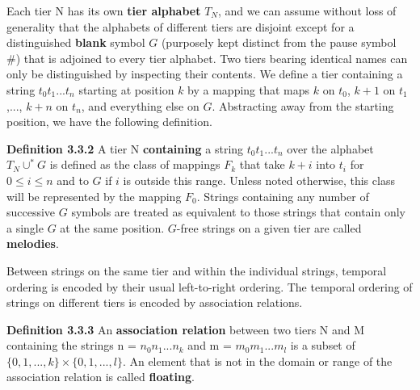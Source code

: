 
\bigskip
\hspace*{8mm}
\vbox{
}

\bigskip\noindent 
Each tier N has its own {\bf tier alphabet} $T_N$, and we can assume without
loss of generality that the alphabets of different tiers are disjoint except
for a distinguished {\bf blank} symbol $G$ (purposely kept distinct from the
pause symbol \#) that is adjoined to every tier alphabet. 
Two tiers bearing identical names can only be distinguished by inspecting
their contents.  We define a tier containing a string $t_0t_1...t_n$ starting
at position $k$ by a mapping that maps $k$ on $t_0$, $k+1$ on $t_1$,...,
$k+n$ on $t_n$, and everything else on $G.$  Abstracting away from the starting
position, we have the following definition.

\smallskip\noindent
{\bf Definition 3.3.2} A tier N {\bf containing} a string $t_0t_1...t_n$ over
the alphabet $T_N\cup^* G$ is defined as the class of mappings $F_k$ that take
$k+i$ into $t_i$ for $0 \leq i \leq n$ and to $G$ if $i$ is outside this
range.  Unless noted otherwise, this class will be represented by the mapping
$F_0$.  Strings containing any number of successive $G$ symbols are treated as
equivalent to those strings that contain only a single $G$ at the same
position. $G$-free strings on a given tier are called {\bf melodies}.

Between strings on the same tier and within the individual strings, temporal
ordering is encoded by their usual left-to-right ordering.  The temporal
ordering of strings on different tiers is encoded by association relations.

\smallskip\noindent
{\bf Definition 3.3.3} An {\bf association relation} between two tiers N
and M containing the strings n = $n_0n_1...n_k$ and m = $m_0m_1...m_l$
is a subset of $\{0,1,...,k\} \times \{0,1,...,l\}$. An element that is
not in the domain or range of the association relation is called {\bf 
floating}.  


